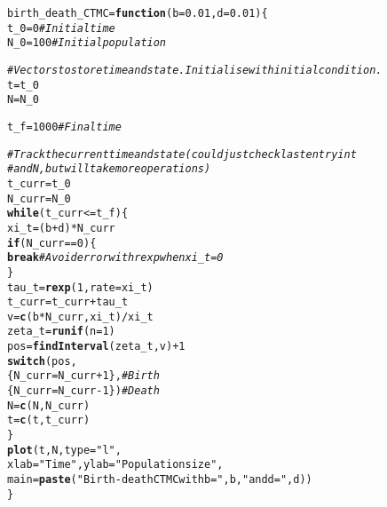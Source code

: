 \documentclass[aspectratio=169]{beamer}\usepackage[]{graphicx}\usepackage[]{xcolor}
\makeatletter
\newcommand{\hlnum}[1]{\textcolor[rgb]{0.686,0.059,0.569}{#1}}%
\newcommand{\hlsng}[1]{\textcolor[rgb]{0.192,0.494,0.8}{#1}}%
\newcommand{\hlcom}[1]{\textcolor[rgb]{0.678,0.584,0.686}{\textit{#1}}}%
\newcommand{\hlopt}[1]{\textcolor[rgb]{0,0,0}{#1}}%
\newcommand{\hldef}[1]{\textcolor[rgb]{0.345,0.345,0.345}{#1}}%
\newcommand{\hlkwa}[1]{\textcolor[rgb]{0.161,0.373,0.58}{\textbf{#1}}}%
\newcommand{\hlkwb}[1]{\textcolor[rgb]{0.69,0.353,0.396}{#1}}%
\newcommand{\hlkwc}[1]{\textcolor[rgb]{0.333,0.667,0.333}{#1}}%
\newcommand{\hlkwd}[1]{\textcolor[rgb]{0.737,0.353,0.396}{\textbf{#1}}}%
\newenvironment{kframe}{%
 \def\at@end@of@kframe{}%
 \ifinner\ifhmode%
  \def\at@end@of@kframe{\end{minipage}}%
  \begin{minipage}{\columnwidth}%
 \fi\fi%
 \def\FrameCommand##1{\hskip\@totalleftmargin \hskip-\fboxsep
 \colorbox{shadecolor}{##1}\hskip-\fboxsep
     \hskip-\linewidth \hskip-\@totalleftmargin \hskip\columnwidth}%
 \MakeFramed {\advance\hsize-\width
   \@totalleftmargin\z@ \linewidth\hsize
   \@setminipage}}%
 {\par\unskip\endMakeFramed%
 \at@end@of@kframe}
\newenvironment{knitrout}{}{} %
\makeatother
\begin{document}
\begin{frame}

\begin{knitrout}
\color{fgcolor}\begin{kframe}
\begin{alltt}
\hldef{birth_death_CTMC} \hlkwb{=} \hlkwa{function}\hldef{(}\hlkwc{b} \hldef{=} \hlnum{0.01}\hldef{,} \hlkwc{d} \hldef{=} \hlnum{0.01}\hldef{) \{}
  \hldef{t_0} \hlkwb{=} \hlnum{0}    \hlcom{# Initial time}
  \hldef{N_0} \hlkwb{=} \hlnum{100}  \hlcom{# Initial population}

  \hlcom{# Vectors to store time and state. Initialise with initial condition.}
  \hldef{t} \hlkwb{=} \hldef{t_0}
  \hldef{N} \hlkwb{=} \hldef{N_0}

  \hldef{t_f} \hlkwb{=} \hlnum{1000}  \hlcom{# Final time}

  \hlcom{# Track the current time and state (could just check last entry in t}
  \hlcom{# and N, but will take more operations)}
  \hldef{t_curr} \hlkwb{=} \hldef{t_0}
  \hldef{N_curr} \hlkwb{=} \hldef{N_0}
  \hlkwa{while} \hldef{(t_curr}\hlopt{<=}\hldef{t_f) \{}
    \hldef{xi_t} \hlkwb{=} \hldef{(b}\hlopt{+}\hldef{d)}\hlopt{*}\hldef{N_curr}
    \hlkwa{if} \hldef{(N_curr} \hlopt{==} \hlnum{0}\hldef{) \{}
      \hlkwa{break} \hlcom{# Avoid error with rexp when xi_t = 0}
    \hldef{\}}
    \hldef{tau_t} \hlkwb{=} \hlkwd{rexp}\hldef{(}\hlnum{1}\hldef{,} \hlkwc{rate} \hldef{= xi_t)}
    \hldef{t_curr} \hlkwb{=} \hldef{t_curr}\hlopt{+}\hldef{tau_t}
    \hldef{v} \hlkwb{=} \hlkwd{c}\hldef{(b}\hlopt{*}\hldef{N_curr, xi_t)}\hlopt{/}\hldef{xi_t}
    \hldef{zeta_t} \hlkwb{=} \hlkwd{runif}\hldef{(}\hlkwc{n} \hldef{=} \hlnum{1}\hldef{)}
    \hldef{pos} \hlkwb{=} \hlkwd{findInterval}\hldef{(zeta_t, v)}\hlopt{+}\hlnum{1}
    \hlkwd{switch}\hldef{(pos,}
           \hldef{\{ N_curr} \hlkwb{=} \hldef{N_curr}\hlopt{+}\hlnum{1}\hldef{\},}  \hlcom{# Birth}
           \hldef{\{ N_curr} \hlkwb{=} \hldef{N_curr}\hlopt{-}\hlnum{1}\hldef{\})} \hlcom{# Death}
    \hldef{N} \hlkwb{=} \hlkwd{c}\hldef{(N, N_curr)}
    \hldef{t} \hlkwb{=} \hlkwd{c}\hldef{(t, t_curr)}
  \hldef{\}}
  \hlkwd{plot}\hldef{(t, N,} \hlkwc{type} \hldef{=} \hlsng{"l"}\hldef{,}
       \hlkwc{xlab} \hldef{=} \hlsng{"Time"}\hldef{,} \hlkwc{ylab} \hldef{=} \hlsng{"Population size"}\hldef{,}
       \hlkwc{main} \hldef{=} \hlkwd{paste}\hldef{(}\hlsng{"Birth-death CTMC with b ="}\hldef{, b,} \hlsng{"and d ="}\hldef{, d))}
\hldef{\}}
\end{alltt}
\end{kframe}
\end{knitrout}

\end{frame}
\end{document}
